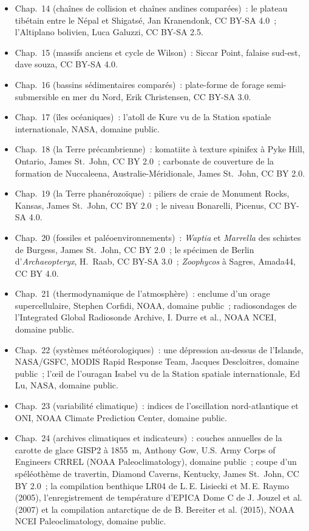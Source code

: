 \begin{itemize}
  \item Chap.~14 (chaînes de collision et chaînes andines comparées)~: le plateau tibétain entre le Népal et Shigatsé, Jan Kranendonk, CC BY-SA 4.0~; l'Altiplano bolivien, Luca Galuzzi, CC BY-SA 2.5.
  \item Chap.~15 (massifs anciens et cycle de Wilson)~: Siccar Point, falaise sud-est, dave souza, CC BY-SA 4.0.
  \item Chap.~16 (bassins sédimentaires comparés)~: plate-forme de forage semi-submersible en mer du Nord, Erik Christensen, CC BY-SA 3.0.
  \item Chap.~17 (îles océaniques)~: l'atoll de Kure vu de la Station spatiale internationale, NASA, domaine public.
  \item Chap.~18 (la Terre précambrienne)~: komatiite à texture spinifex à Pyke Hill, Ontario, James St.~John, CC BY 2.0~; carbonate de couverture de la formation de Nuccaleena, Australie-Méridionale, James St.~John, CC BY 2.0.
  \item Chap.~19 (la Terre phanérozoïque)~: piliers de craie de Monument Rocks, Kansas, James St.~John, CC BY 2.0~; le niveau Bonarelli, Picenus, CC BY-SA 4.0.
  \item Chap.~20 (fossiles et paléoenvironnements)~: \emph{Waptia} et \emph{Marrella} des schistes de Burgess, James St.~John, CC BY 2.0~; le spécimen de Berlin d'\emph{Archaeopteryx}, H.~Raab, CC BY-SA 3.0~; \emph{Zoophycos} à Sagres, Amada44, CC BY 4.0.
  \item Chap.~21 (thermodynamique de l'atmosphère)~: enclume d'un orage supercellulaire, Stephen Corfidi, NOAA, domaine public~; radiosondages de l'Integrated Global Radiosonde Archive, I. Durre et al., NOAA NCEI, domaine public.
  \item Chap.~22 (systèmes météorologiques)~: une dépression au-dessus de l'Islande, NASA/GSFC, MODIS Rapid Response Team, Jacques Descloitres, domaine public~; l'œil de l'ouragan Isabel vu de la Station spatiale internationale, Ed Lu, NASA, domaine public.
  \item Chap.~23 (variabilité climatique)~: indices de l'oscillation nord-atlantique et ONI, NOAA Climate Prediction Center, domaine public.
  \item Chap.~24 (archives climatiques et indicateurs)~: couches annuelles de la carotte de glace GISP2 à 1855~m, Anthony Gow, U.S. Army Corps of Engineers CRREL (NOAA Paleoclimatology), domaine public~; coupe d'un spéléothème de travertin, Diamond Caverns, Kentucky, James St.~John, CC BY 2.0~; la compilation benthique LR04 de L.\,E. Lisiecki et M.\,E. Raymo (2005), l'enregistrement de température d'EPICA Dome C de J. Jouzel et al. (2007) et la compilation antarctique de  de B. Bereiter et al. (2015), NOAA NCEI Paleoclimatology, domaine public.

\end{itemize}
